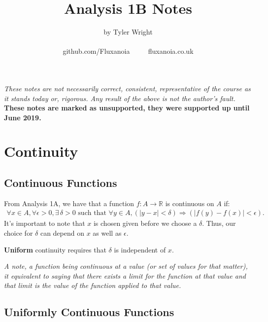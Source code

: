 \documentclass[a4paper, 12pt, twoside]{article}
\begin{document}
\title{Analysis 1B Notes}
\date{}
\author{by Tyler Wright \\
  \\
  github.com/Fluxanoia $\qquad$ fluxanoia.co.uk
}
\maketitle

\vfill

\textit{These notes are not necessarily correct,
consistent, representative of the course as it stands today or,
rigorous. Any result of the above is not the author's fault.}
\\[\baselineskip]
\textbf{These notes are marked as unsupported, they were supported
up until June 2019.}

\newpage

\section{Continuity}

\subsection{Continuous Functions}

From Analysis 1A, we have that a function $f: A \to \mathbb{R}$
is continuous on $A$ if:
\begin{align*}
      \forall x \in A, \forall \epsilon > 0, \exists\,\delta > 0
      \text{ such that } \forall y \in A,
      (|y - x| < \delta) \Rightarrow (|f(y) - f(x)| < \epsilon).
\end{align*}
It's important to note that $x$ is chosen given before we choose a
$\delta$. Thus, our choice for $\delta$ can depend on $x$ as well as
$\epsilon$.

\vspace{\baselineskip}

\textbf{Uniform} continuity requires that $\delta$ is independent of
$x$.

\vspace{\baselineskip}

\textit{A note, a function being continuous at a value (or set
      of values for that matter), it equivalent to saying that
      there exists a limit for the function at that value and that limit
      is the value of the function applied to that value.}

\subsection{Uniformly Continuous Functions}
\end{document}
